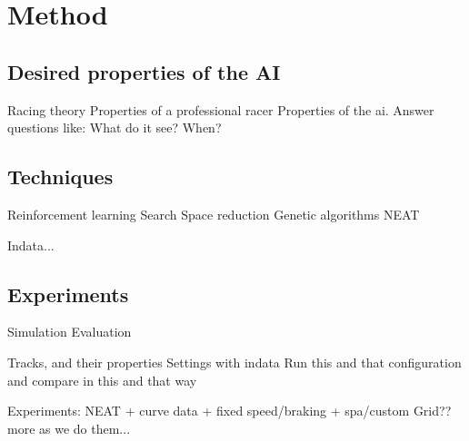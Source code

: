 \chapter{Method}


\section{Desired properties of the AI}
 Racing theory
 Properties of a professional racer
 Properties of the ai. Answer questions like:
    What do it see?
    When?
    
\section{Techniques}
 Reinforcement learning
 Search Space reduction
 Genetic algorithms
 NEAT

 Indata...

\section{Experiments}
 Simulation
 Evaluation
 
 Tracks, and their properties
 Settings with indata
 Run this and that configuration and compare in this and that way

 Experiments:
    NEAT + curve data + fixed speed/braking + spa/custom
    Grid??
    more as we do them...